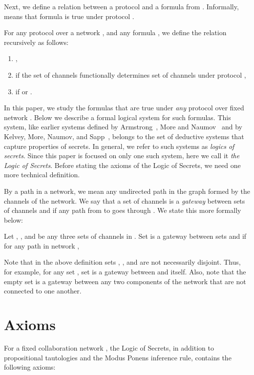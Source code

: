 \documentclass{llncs}
\begin{document}
Next, we define a relation  between a protocol and a formula from .  Informally,  means that formula  is true under protocol . 
\begin{definition}\label{}
For any protocol  over a network , and any formula , we define the relation  recursively as follows:
\begin{enumerate}
\item ,
\item  if the set of channels  functionally determines set of channels  under protocol ,
\item  if  or .
\end{enumerate}
\end{definition}
In this paper, we study the formulas  that are true under {\em any} protocol  over fixed network . 
Below we describe a formal logical system for such formulas.  This system, like earlier systems defined by Armstrong~\cite{a74}, More and Naumov~\cite{mn09,mn09a,mn10clima} and by Kelvey, More, Naumov, and Sapp~\cite{kmns10},  belongs to the set of deductive systems that capture properties of secrets.  In general, we refer to such systems as {\em logics of secrets}. Since this paper is focused on only one such system, here we call it {\em the Logic of Secrets}. Before stating the axioms of the Logic of Secrets, we need one more technical definition.

By a path in a network, we mean any undirected path in the graph formed by the channels of the network.
We say that a set of channels  is a {\em gateway} between sets of channels  and  if any path from  to  goes through .  We state this more formally below:

\begin{definition}\label{gateway}
Let , , and  be any three sets of channels in . Set  is a gateway between sets  and  if
for any path  in network ,

\end{definition}
Note that in the above definition sets , , and  are not necessarily disjoint. Thus, for example, for any set ,
set  is a gateway between  and itself. Also, note that the empty set is a gateway between any two components of the network that are not connected to one another.

\section{Axioms}

For a fixed collaboration network , the Logic of Secrets, in addition to propositional tautologies and the Modus Ponens inference rule, contains the following axioms:
\end{document}
